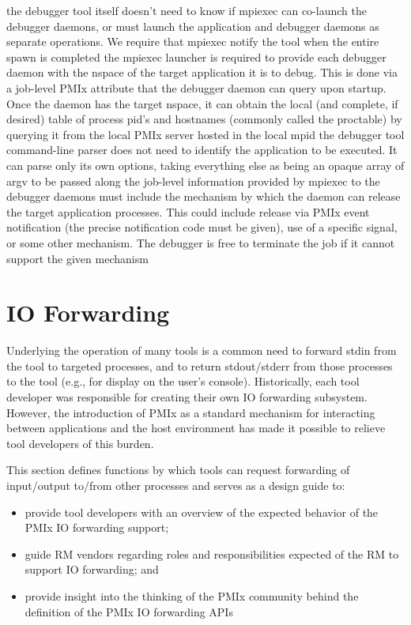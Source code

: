     the debugger tool itself doesn’t need to know if mpiexec can co-launch the debugger daemons, or must launch the application and debugger daemons as separate operations. We require that mpiexec notify the tool when the entire spawn is completed
    the mpiexec launcher is required to provide each debugger daemon with the nspace of the target application it is to debug. This is done via a job-level PMIx attribute that the debugger daemon can query upon startup. Once the daemon has the target nspace, it can obtain the local (and complete, if desired) table of process pid’s and hostnames (commonly called the proctable) by querying it from the local PMIx server hosted in the local mpid
    the debugger tool command-line parser does not need to identify the application to be executed. It can parse only its own options, taking everything else as being an opaque array of argv to be passed along
    the job-level information provided by mpiexec to the debugger daemons must include the mechanism by which the daemon can release the target application processes. This could include release via PMIx event notification (the precise notification code must be given), use of a specific signal, or some other mechanism. The debugger is free to terminate the job if it cannot support the given mechanism


\section{IO Forwarding}
\label{chap:api_tools:iof}


Underlying the operation of many tools is a common need to forward stdin from the tool to targeted processes, and to return stdout/stderr from those processes to the tool (e.g., for display on the user’s console). Historically, each tool developer was responsible for creating their own \ac{IO} forwarding subsystem. However, the introduction of \ac{PMIx} as a standard mechanism for interacting between applications and the host environment has made it possible to relieve tool developers of this burden.

This section defines functions by which tools can request forwarding of input/output to/from other processes and serves as a design guide to:

\begin{itemize}
    \item provide tool developers with an overview of the expected behavior of the \ac{PMIx} \ac{IO} forwarding support;
    \item guide \ac{RM} vendors regarding roles and responsibilities expected of the \ac{RM} to support \ac{IO} forwarding; and
    \item provide insight into the thinking of the \ac{PMIx} community behind the definition of the \ac{PMIx} \ac{IO} forwarding \acp{API}
\end{itemize}

